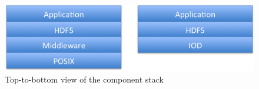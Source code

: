 \documentclass[conference]{IEEEtran}
\begin{document}
%
%

\begin{figure}[htbp]
\centering
\includegraphics[scale=0.30]{images/exa-stack.png}
\caption{Top-to-bottom view of the component stack}
\label{fig:exa-stack}
\end{figure}

%
%
\end{document}
